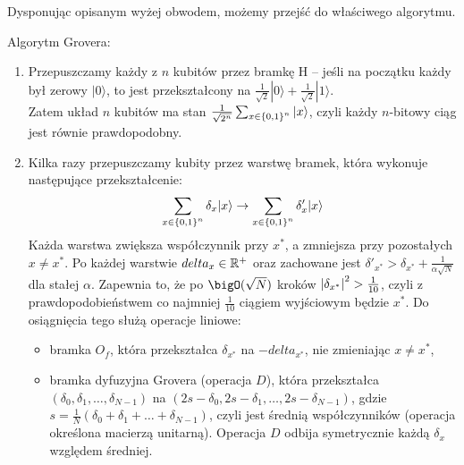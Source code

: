 Dysponując opisanym wyżej obwodem, możemy przejść do właściwego algorytmu.
\begin{greyframe}
    Algorytm Grovera:
    \begin{enumerate}
        \item Przepuszczamy każdy z \( n \) kubitów przez bramkę H -- jeśli na początku każdy był zerowy \( |0\rangle \), to jest przekształcony na \( \frac{1}{\sqrt{2}}|0\rangle + \frac{1}{\sqrt{2}}|1\rangle \). \\
        Zatem układ \( n \) kubitów ma stan \( \frac{1}{\sqrt{2^n}} \sum_{x \in \set{0,1}^n} |x\rangle \), czyli każdy \( n \)-bitowy ciąg jest równie prawdopodobny.
        \item Kilka razy przepuszczamy kubity przez warstwę bramek, która wykonuje następujące przekształcenie:
        \[
            \sum_{x \in \set{0,1}^n} \delta_x |x\rangle \rightarrow \sum_{x \in \set{0,1}^n} \delta'_x |x\rangle
        \]
        Każda warstwa zwiększa współczynnik przy \( x^{*} \), a zmniejsza przy pozostałych \( x \neq x^{*} \). Po każdej warstwie \( delta_x \in \mathbb{R}^{+} \)
        oraz zachowane jest \( \delta'_{x^{*}} > \delta_{x^{*}} + \frac{1}{\alpha\sqrt{N}} \) dla stałej \( \alpha \).
        Zapewnia to, że po  \( \bigO(\sqrt{N}) \) kroków \( \left\lvert\delta_{x^{*}}\right\rvert^2 > \frac{1}{10} \), czyli z prawdopodobieństwem co najmniej \( \frac{1}{10} \) ciągiem wyjściowym będzie \( x^{*} \).
        Do osiągnięcia tego służą operacje liniowe:
        \begin{itemize}
            \item bramka \( O_f \), która przekształca \( \delta_{x^{*}} \) na \( -delta_{x^{*}} \), nie zmieniając \( x \neq x^{*} \),
            \item bramka dyfuzyjna Grovera (operacja \( D \)), która przekształca \( (\delta_0, \delta_1, \ldots, \delta_{N-1}) \) na \( (2s - \delta_0, 2s - \delta_1, \ldots, 2s - \delta_{N-1}) \),
            gdzie \( s = \frac{1}{N}(\delta_0 + \delta_1 + \ldots + \delta_{N-1}) \), czyli jest średnią współczynników (operacja określona macierzą unitarną).
            Operacja \( D \) odbija symetrycznie każdą \( \delta_x \) względem średniej.
        \end{itemize}
    \end{enumerate}
\end{greyframe}

